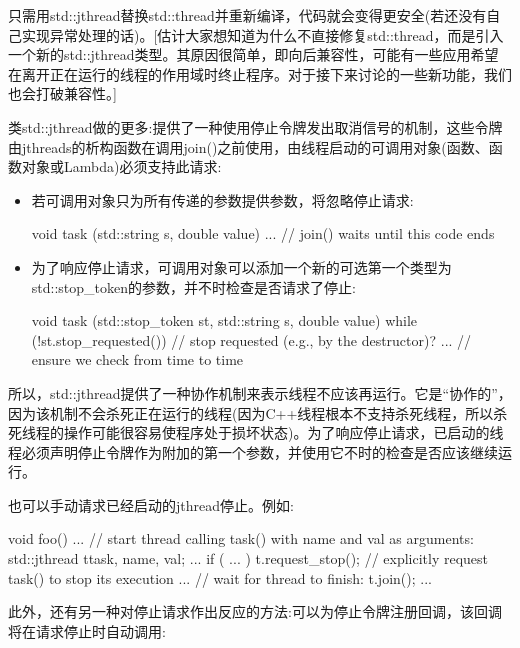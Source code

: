 只需用std::jthread替换std::thread并重新编译，代码就会变得更安全(若还没有自己实现异常处理的话)。[估计大家想知道为什么不直接修复std::thread，而是引入一个新的std::jthread类型。其原因很简单，即向后兼容性，可能有一些应用希望在离开正在运行的线程的作用域时终止程序。对于接下来讨论的一些新功能，我们也会打破兼容性。]


类std::jthread做的更多:提供了一种使用停止令牌发出取消信号的机制，这些令牌由jthreads的析构函数在调用join()之前使用，由线程启动的可调用对象(函数、函数对象或Lambda)必须支持此请求:

\begin{itemize}
\item
若可调用对象只为所有传递的参数提供参数，将忽略停止请求:

\begin{cpp}
void task (std::string s, double value)
{
	... // join() waits until this code ends
}
\end{cpp}

\item
为了响应停止请求，可调用对象可以添加一个新的可选第一个类型为std::stop\_token的参数，并不时检查是否请求了停止:

\begin{cpp}
void task (std::stop_token st,
std::string s, double value)
{
	while (!st.stop_requested()) { // stop requested (e.g., by the destructor)?
		... // ensure we check from time to time
	}
}
\end{cpp}
\end{itemize}

所以，std::jthread提供了一种协作机制来表示线程不应该再运行。它是“协作的”，因为该机制不会杀死正在运行的线程(因为C++线程根本不支持杀死线程，所以杀死线程的操作可能很容易使程序处于损坏状态)。为了响应停止请求，已启动的线程必须声明停止令牌作为附加的第一个参数，并使用它不时的检查是否应该继续运行。

也可以手动请求已经启动的jthread停止。例如:

\begin{cpp}
void foo()
{
	...
	// start thread calling task() with name and val as arguments:
	std::jthread t{task, name, val};
	...
	if ( ... ) {
		t.request_stop(); // explicitly request task() to stop its execution
	}
	...
	// wait for thread to finish:
	t.join();
	...
}
\end{cpp}

此外，还有另一种对停止请求作出反应的方法:可以为停止令牌注册回调，该回调将在请求停止时自动调用:

